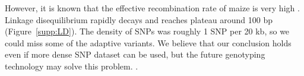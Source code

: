 \label{other explanations}



\label{low power}
However, it is known that the effective recombination rate of maize is very high \cite[]{Tenaillon_2001_11470895}.
Linkage disequilibrium rapidly decays and reaches plateau around 100 bp (Figure~\ref{supp:LD}).
The density of SNPs was roughly 1 SNP per 20 kb, so we could miss some of the adaptive variants.
We believe that our conclusion holds even if more dense SNP dataset can be used, but the future genotyping technology may solve this problem.
\cite[]{tiffin2014advances}.

